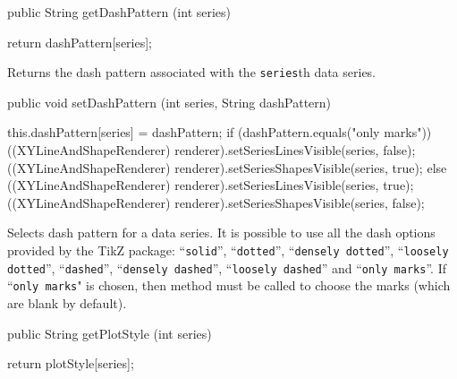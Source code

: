 \begin{htmlonly}
\end{htmlonly}
\begin{code}

   public String getDashPattern (int series) \begin{hide} {
      return dashPattern[series];
   }\end{hide}
\end{code}
\begin{tabb}
   Returns the dash pattern associated with the \texttt{series}th data series.
\end{tabb}
\begin{htmlonly}
\end{htmlonly}
\begin{code}

   public void setDashPattern (int series, String dashPattern) \begin{hide} {
      this.dashPattern[series] = dashPattern;
      if (dashPattern.equals("only marks")) {
          ((XYLineAndShapeRenderer) renderer).setSeriesLinesVisible(series, false);
          ((XYLineAndShapeRenderer) renderer).setSeriesShapesVisible(series, true);
      } else {
          ((XYLineAndShapeRenderer) renderer).setSeriesLinesVisible(series, true);
          ((XYLineAndShapeRenderer) renderer).setSeriesShapesVisible(series, false);
      }
   }\end{hide}
\end{code}
\begin{tabb}
Selects dash pattern for a data series. It is possible to use all the dash
options provided by the TikZ package: ``\texttt{solid}'', ``\texttt{dotted}'',
``\texttt{densely dotted}'', ``\texttt{loosely dotted}'', ``\texttt{dashed}'',
``\texttt{densely dashed}'', ``\texttt{loosely dashed}'' and
``\texttt{only marks}''. If ``\texttt{only marks}" is chosen, then method
 must be called to choose the marks
(which are blank by default).
\end{tabb}
\begin{htmlonly}
\end{htmlonly}
\begin{code}

   public String getPlotStyle (int series) \begin{hide} {
      return plotStyle[series];
   }\end{hide}
\end{code}
